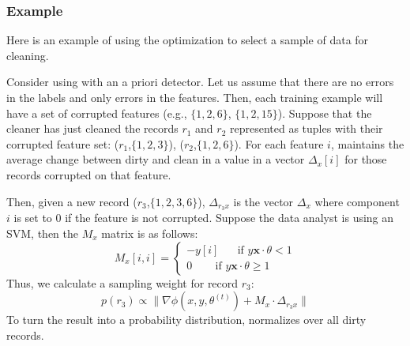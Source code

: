 \subsubsection{Example}
Here is an example of using the optimization to select a sample of data for cleaning.
\begin{example}\label{estex}
Consider using \sys with an a priori detector.
Let us assume that there are no errors in the labels and only errors in the features.
Then, each training example will have a set of corrupted features (e.g., $\{1,2,6\}$, $\{1,2,15\}$).
Suppose that the cleaner has just cleaned the records $r_1$ and $r_2$ represented as tuples with their corrupted feature set: ($r_1$,$\{1,2,3\}$), ($r_2$,$\{1,2,6\}$).
For each feature $i$, \sys maintains the average change between dirty and clean in a value in a vector $\Delta_x[i]$ for those records corrupted on that feature. 

Then, given a new record ($r_3$,$\{1,2,3,6\}$), $\Delta_{r_3x}$ is the vector $\Delta_x$ where component $i$ is set to 0 if the feature is not corrupted.
Suppose the data analyst is using an SVM, then the $M_x$ matrix is as follows:
\[
M_x[i,i] = \begin{cases}      
-y[i] ~~~~~~\text{ if } y\boldsymbol{x}\cdot\theta < 1 \\
0\ ~~~~~~~\text{ if } y\boldsymbol{x}\cdot\theta \geq 1      
\end{cases} 
\]
Thus, we calculate a sampling weight for record $r_3$:
\[
p(r_3) \propto\|\nabla\phi(x,y,\theta^{(t)}) + M_x \cdot \Delta_{r_3x} \|
\] 
To turn the result into a probability distribution, \sys normalizes over all dirty records.
\end{example}


